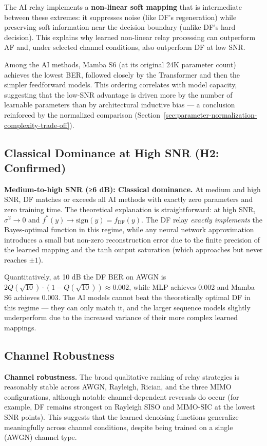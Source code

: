 The AI relay implements a \textbf{non-linear soft mapping} that is intermediate between these extremes: it suppresses noise (like DF's regeneration) while preserving soft information near the decision boundary (unlike DF's hard decision). This explains why learned non-linear relay processing can outperform AF and, under selected channel conditions, also outperform DF at low SNR.

Among the AI methods, Mamba S6 (at its original 24K parameter count) achieves the lowest BER, followed closely by the Transformer and then the simpler feedforward models. This ordering correlates with model capacity, suggesting that the low-SNR advantage is driven more by the number of learnable parameters than by architectural inductive bias --- a conclusion reinforced by the normalized comparison (Section~\ref{sec:parameter-normalization-complexity-trade-off}).

\subsection{Classical Dominance at High SNR (H2: Confirmed)}\label{sec:classical-dominance-at-high-snr-h2-confirmed}

\textbf{Medium-to-high SNR (≥6 dB): Classical dominance.} At medium and high SNR, DF matches or exceeds all AI methods with exactly zero parameters and zero training time. The theoretical explanation is straightforward: at high SNR, \(\sigma^2 \to 0\) and \(f^*(y) \to \text{sign}(y) = f_{\text{DF}}(y)\). The DF relay \emph{exactly implements} the Bayes-optimal function in this regime, while any neural network approximation introduces a small but non-zero reconstruction error due to the finite precision of the learned mapping and the tanh output saturation (which approaches but never reaches \(\pm 1\)).

Quantitatively, at 10 dB the DF BER on AWGN is \(2Q(\sqrt{10}) \cdot (1 - Q(\sqrt{10})) \approx 0.002\), while MLP achieves 0.002 and Mamba S6 achieves 0.003. The AI models cannot beat the theoretically optimal DF in this regime --- they can only match it, and the larger sequence models slightly underperform due to the increased variance of their more complex learned mappings.

\subsection{Channel Robustness}\label{sec:channel-robustness}

\textbf{Channel robustness.} The broad qualitative ranking of relay strategies is reasonably stable across AWGN, Rayleigh, Rician, and the three MIMO configurations, although notable channel-dependent reversals do occur (for example, DF remains strongest on Rayleigh SISO and MIMO-SIC at the lowest SNR points). This suggests that the learned denoising functions generalize meaningfully across channel conditions, despite being trained on a single (AWGN) channel type.

